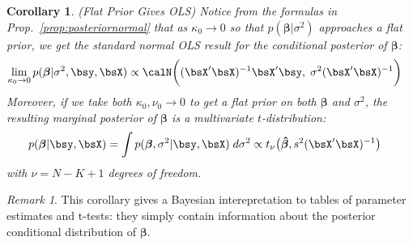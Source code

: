 \documentclass[12pt]{article}
\theoremstyle{plain}
\newtheorem{cor}[thm]{Corollary}
\theoremstyle{definition}
\theoremstyle{remark}
\newtheorem*{rmk}{Remark}
\newcommand{\ra}{\rightarrow}
\newcommand{\bsbeta}{\boldsymbol{\beta}}
\newcommand{\bshatbeta}{\boldsymbol{\hat{\beta}}}
\begin{document}
\begin{cor}\emph{(Flat Prior Gives OLS)}
\label{cor:flatpriorols}
Notice from the formulas in Prop.~\ref{prop:posteriornormal} that as
$\kappa_0\ra 0$ so that $p(\bsbeta|\sigma^2)$ approaches a flat prior,
we get the standard normal OLS result for the conditional posterior of
$\bsbeta$:
\begin{align*}
  \lim_{\kappa_0\ra 0}
  p(\bsbeta | \sigma^2, \bsy, \bsX)
  &\propto
  \calN\bigg(
  (\bsX'\bsX)^{-1}
  \bsX'\bsy,\;
  \sigma^2(\bsX'\bsX)^{-1}
  \bigg)
\end{align*}
Moreover, if we take both $\kappa_0,\nu_0\ra 0$ to get a flat prior on
both $\bsbeta$ and $\sigma^2$, the resulting marginal posterior of
$\bsbeta$ is a multivariate $t$-distribution:
\begin{align*}
  p(\bsbeta|\bsy,\bsX)
  &= \int p(\bsbeta,\sigma^2| \bsy,\bsX) \; d\sigma^2
  \propto
  t_\nu\big(\bshatbeta,s^2(\bsX'\bsX)^{-1}\big)
\end{align*}
with $\nu=N-K+1$ degrees of freedom.
\end{cor}
\begin{rmk}
This corollary gives a Bayesian interepretation to tables of parameter
estimates and t-tests: they simply contain information about the
posterior conditional distribution of $\bsbeta$.
\end{rmk}
\end{document}

